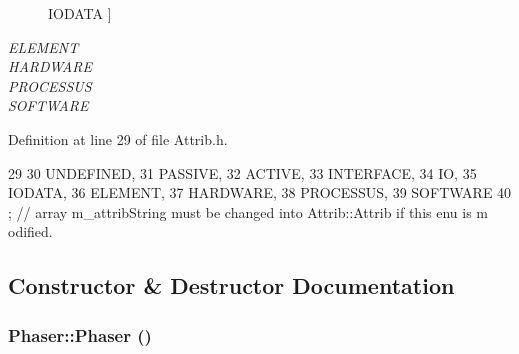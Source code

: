 \begin{Desc}
\begin{description}
{\hypertarget{classAttrib_a69e171d7cc6417835a5a306d3c764235a0af3b0d0ac323c1704e6c69cf90add28}{
IODATA}
\label{classAttrib_a69e171d7cc6417835a5a306d3c764235a0af3b0d0ac323c1704e6c69cf90add28}
}]\item[{\em 
\hypertarget{classAttrib_a69e171d7cc6417835a5a306d3c764235a7788bc5dd333fd8ce18562b269c9dab1}{
ELEMENT}
\label{classAttrib_a69e171d7cc6417835a5a306d3c764235a7788bc5dd333fd8ce18562b269c9dab1}
}]\item[{\em 
\hypertarget{classAttrib_a69e171d7cc6417835a5a306d3c764235a61ceb22149f365f1780d18f9d1459423}{
HARDWARE}
\label{classAttrib_a69e171d7cc6417835a5a306d3c764235a61ceb22149f365f1780d18f9d1459423}
}]\item[{\em 
\hypertarget{classAttrib_a69e171d7cc6417835a5a306d3c764235a75250e29692496e73effca2c0330977f}{
PROCESSUS}
\label{classAttrib_a69e171d7cc6417835a5a306d3c764235a75250e29692496e73effca2c0330977f}
}]\item[{\em 
\hypertarget{classAttrib_a69e171d7cc6417835a5a306d3c764235a103a67cd0b8f07ef478fa45d4356e27b}{
SOFTWARE}
\label{classAttrib_a69e171d7cc6417835a5a306d3c764235a103a67cd0b8f07ef478fa45d4356e27b}
}]\end{description}
\end{Desc}



Definition at line 29 of file Attrib.h.


\begin{DoxyCode}
29                 {
30     UNDEFINED,
31     PASSIVE,
32     ACTIVE,
33     INTERFACE,
34     IO,
35     IODATA,
36     ELEMENT,
37     HARDWARE,
38     PROCESSUS,
39     SOFTWARE 
40   }; // array m_attribString must be changed into Attrib::Attrib if this enu is m
      odified. 
\end{DoxyCode}


\subsection{Constructor \& Destructor Documentation}
\hypertarget{classPhaser_a849a7f7cd7d1491c490e4ba8e9906af0}{
\subsubsection[{Phaser}]{\setlength{\rightskip}{0pt plus 5cm}Phaser::Phaser ()}}
\label{classPhaser_a849a7f7cd7d1491c490e4ba8e9906af0}


